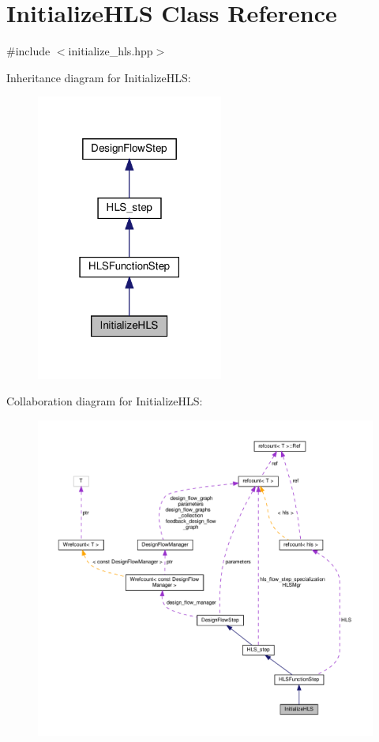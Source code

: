 \hypertarget{classInitializeHLS}{}\section{Initialize\+H\+LS Class Reference}
\label{classInitializeHLS}


{\ttfamily \#include $<$initialize\+\_\+hls.\+hpp$>$}



Inheritance diagram for Initialize\+H\+LS\+:
\nopagebreak
\begin{figure}[H]
\begin{center}
\leavevmode
\includegraphics[width=174pt]{d0/d3d/classInitializeHLS__inherit__graph}
\end{center}
\end{figure}


Collaboration diagram for Initialize\+H\+LS\+:
\nopagebreak
\begin{figure}[H]
\begin{center}
\leavevmode
\includegraphics[width=350pt]{d7/d0b/classInitializeHLS__coll__graph}
\end{center}
\end{figure}
